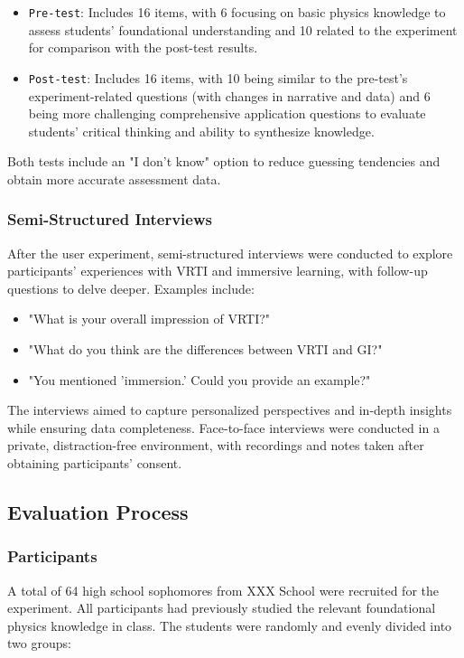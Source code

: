 \documentclass[runningheads]{llncs}
\begin{document}
\begin{itemize}
  \item {\texttt{Pre-test}}: Includes 16 items, with 6 focusing on basic physics knowledge to assess students' foundational understanding and 10 related to the experiment for comparison with the post-test results.

  \item {\texttt{Post-test}}: Includes 16 items, with 10 being similar to the pre-test's experiment-related questions (with changes in narrative and data) and 6 being more challenging comprehensive application questions to evaluate students' critical thinking and ability to synthesize knowledge.
\end{itemize}

Both tests include an "I don't know" option to reduce guessing tendencies and obtain more accurate assessment data.

\subsubsection{Semi-Structured Interviews}
After the user experiment, semi-structured interviews were conducted to explore participants' experiences with VRTI and immersive learning, with follow-up questions to delve deeper. Examples include:

\begin{itemize}
  \item "What is your overall impression of VRTI?"
  
  \item "What do you think are the differences between VRTI and GI?"
  
  \item "You mentioned 'immersion.' Could you provide an example?"
\end{itemize}

The interviews aimed to capture personalized perspectives and in-depth insights while ensuring data completeness. Face-to-face interviews were conducted in a private, distraction-free environment, with recordings and notes taken after obtaining participants' consent.

\subsection{Evaluation Process}
\subsubsection{Participants}
A total of 64 high school sophomores from XXX
School were recruited for the experiment. All participants had previously studied the relevant foundational physics knowledge in class. The students were randomly and evenly divided into two groups:
\end{document}
